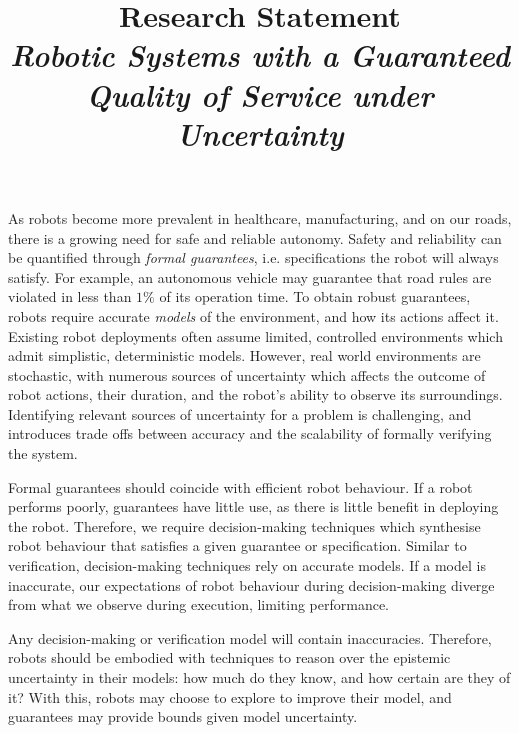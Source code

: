 \documentclass[11pt]{article}
\title{Research Statement\\ \large \emph{Robotic Systems with a Guaranteed Quality of Service under Uncertainty}}
\date{}
\author{}
\begin{document}
\maketitle
\thispagestyle{empty}

As robots become more prevalent in healthcare, manufacturing, and on our roads, there is a growing need for safe and reliable autonomy.
%
Safety and reliability can be quantified through \emph{formal guarantees}, i.e. specifications the robot will always satisfy.
%
For example, an autonomous vehicle may guarantee that road rules are violated in less than $1\%$ of its operation time.
%
To obtain robust guarantees, robots require accurate \emph{models} of the environment, and how its actions affect it.
%
Existing robot deployments often assume limited, controlled environments which admit simplistic, deterministic models.
%
However, real world environments are stochastic, with numerous sources of uncertainty which affects the outcome of robot actions, their duration, and the robot's ability to observe its surroundings.
%
Identifying relevant sources of uncertainty for a problem is challenging, and introduces trade offs between accuracy and the scalability of formally verifying the system.



Formal guarantees should coincide with efficient robot behaviour.
%
If a robot performs poorly, guarantees have little use, as there is little benefit in deploying the robot.
%
Therefore, we require decision-making techniques which synthesise robot behaviour that satisfies a given guarantee or specification.
%
Similar to verification, decision-making techniques rely on accurate models.
%
If a model is inaccurate, our expectations of robot behaviour during decision-making diverge from what we observe during execution, limiting performance.


Any decision-making or verification model will contain inaccuracies.
%
Therefore, robots should be embodied with techniques to reason over the epistemic uncertainty in their models: how much do they know, and how certain are they of it?
%
With this, robots may choose to explore to improve their model, and guarantees may provide bounds given model uncertainty.

\end{document}
